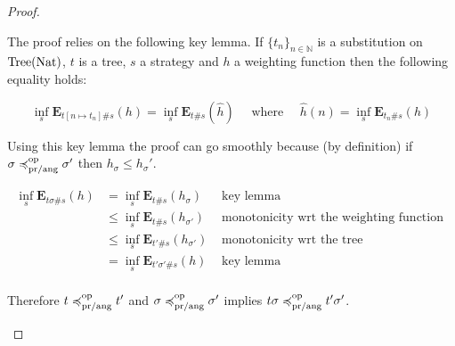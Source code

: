 \begin{proof}
\begin{description}
            The proof relies on the following key lemma.
            If $\{ t_n \}_{n \in \mathbb{N}}$ is a substitution on
            $\textnormal{Tree}(\textnormal{Nat})$, 
            $t$ is a tree, $s$ a strategy and $h$ a weighting function then
            the following equality holds:

            \begin{equation*}
                \inf_s \mathbf{E}_{t [ n \mapsto t_n ] \# s } (h)
                = 
                \inf_s \mathbf{E}_{t \# s} (\hat{h})
                \quad \text{ where } \quad \hat{h} (n) = \inf_s \mathbf{E}_{t_n \# s} (h)
            \end{equation*}

            
            Using this key lemma the proof can go smoothly because (by
            definition)
            if $\sigma \preccurlyeq^{\text{op}}_{\text{pr/ang}} \sigma'$ then 
            $h_\sigma \leq h_\sigma'$.

            \begin{align*}
                \inf_s \mathbf{E}_{t\sigma \# s} (h)
                 & = \inf_s \mathbf{E}_{t \# s} (h_\sigma)       & \text{ key lemma }  \\
                 & \leq \inf_s \mathbf{E}_{t \# s} (h_{\sigma'}) & \text{ monotonicity wrt the weighting function } \\
                 & \leq \inf_s \mathbf{E}_{t'\# s} (h_{\sigma'}) & \text{ monotonicity wrt the tree } \\
                 & = \inf_s \mathbf{E}_{t'\sigma' \# s} (h )     & \text{ key lemma } \\
            \end{align*}

            Therefore $ t \preccurlyeq^{\text{op}}_{\text{pr/ang}} t'$ and $\sigma
            \preccurlyeq^{\text{op}}_{\text{pr/ang}} \sigma'$ implies $t\sigma \preccurlyeq^{\text{op}}_{\text{pr/ang}}
            t'\sigma'$.
    \end{description}

\end{proof}

